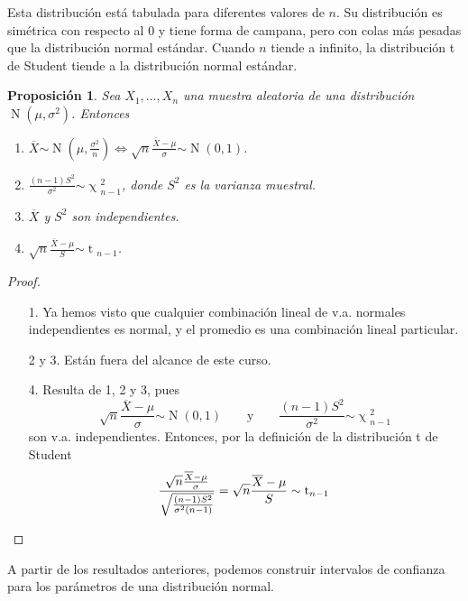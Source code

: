 \documentclass[11pt]{article}
\theoremstyle{plain}
\newtheorem*{pro}{Proposición}
\theoremstyle{definition}
\theoremstyle{remark}
\newcommand{\dists}[1]{\ensuremath{\operatorname{#1}}}  %
\newcommand{\dist}[1]{\ensuremath{\sim \operatorname{#1}}}  %
\begin{document}
      Esta distribución está tabulada para diferentes valores de $n$. Su distribución es simétrica con respecto al 0 y tiene forma de campana, pero con colas más pesadas que la distribución normal estándar. Cuando $n$ tiende a infinito, la distribución t de Student tiende a la distribución normal estándar.

      \begin{pro}
        Sea $X_1, \dots, X_n$ una muestra aleatoria de una distribución $\dists{N}(\mu,\sigma^2)$. Entonces
        \begin{enumerate}
          \item $\displaystyle \overline{X} \dist{N}\left( \mu, \frac{\sigma^2}{n} \right) \Leftrightarrow \sqrt{n} \frac{\overline{X} - \mu}{\sigma} \dist{N}(0,1)$.
          \item $\displaystyle \frac{(n - 1) S^2}{\sigma^2} \dist{\chi}_{n - 1}^2$, donde $S^2$ es la varianza muestral.
          \item $\overline{X}$ y $S^2$ son independientes.
          \item $\displaystyle \sqrt{n} \frac{\overline{X} - \mu}{S} \dist{t}_{n-1}$.
        \end{enumerate}
      \end{pro}
      \begin{proof} \
        \begin{enumerate}
          \item[1.] Ya hemos visto que cualquier combinación lineal de v.a. normales independientes es normal, y el promedio es una combinación lineal particular.
          \item[2 y 3.] Están fuera del alcance de este curso.
          \item[4.] Resulta de 1, 2 y 3, pues
          \[ \sqrt{n} \frac{\overline{X} - \mu}{\sigma} \dist{N}(0,1) \qquad \text{y} \qquad \frac{(n - 1) S^2}{\sigma^2} \dist{\chi}^2_{n - 1} \]
          son v.a. independientes. Entonces, por la definición de la distribución t de Student
          \[ \frac{\sqrt{n} \frac{\overline{X} - \mu}{\sigma}}{\sqrt{\frac{(n - 1) S^2}{\sigma^2 (n - 1)}}} = \sqrt{n} \frac{\overline{X} - \mu}{S} \dist{t}_{n-1} \qedhere \]
        \end{enumerate}
      \end{proof}

      A partir de los resultados anteriores, podemos construir intervalos de confianza para los parámetros de una distribución normal.
\end{document}
